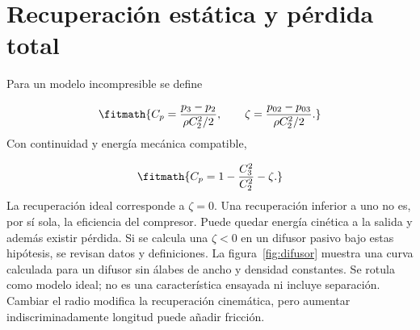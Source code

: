 \documentclass[10pt,openany]{book}
\begin{document}
\section{Recuperación estática y pérdida total}


Para un modelo incompresible se define



\[
\fitmath{C_p=\frac{p_3-p_2}{\rho C_2^2/2},\qquad
\zeta=\frac{p_{02}-p_{03}}{\rho C_2^2/2}.}
\]
Con continuidad y energía mecánica compatible,

\[
\fitmath{C_p=1-\frac{C_3^2}{C_2^2}-\zeta.}
\]
La recuperación ideal corresponde a \(\zeta=0\). Una recuperación inferior a uno no es, por sí sola, la eficiencia del compresor. Puede quedar energía cinética a la salida y además existir pérdida. Si se calcula una \(\zeta<0\) en un difusor pasivo bajo estas hipótesis, se revisan datos y definiciones.
La figura~\ref{fig:difusor} muestra una curva calculada para un difusor sin álabes de ancho y densidad constantes. Se rotula como modelo ideal; no es una característica ensayada ni incluye separación. Cambiar el radio modifica la recuperación cinemática, pero aumentar indiscriminadamente longitud puede añadir fricción.
\end{document}
